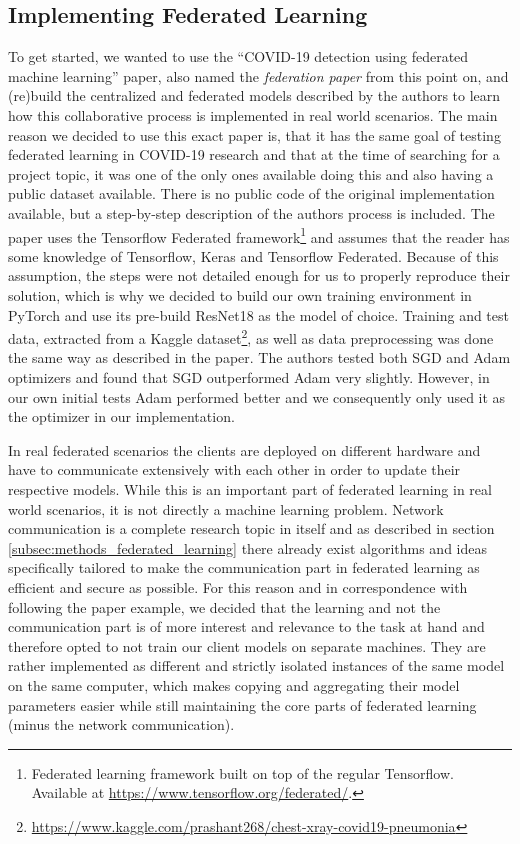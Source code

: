 \subsection{Implementing Federated Learning}\label{subsec:methods_original_paper}
To get started, we wanted to use the \enquote{COVID-19 detection using federated machine learning} paper\cite{federated_machine_learning}, also named the \textit{federation paper} from this point on, and (re)build the centralized and federated models described by the authors to learn how this collaborative process is implemented in real world scenarios. The main reason we decided to use this exact paper is, that it has the same goal of testing federated learning in COVID-19 research and that at the time of searching for a project topic, it was one of the only ones available doing this and also having a public dataset available.
There is no public code of the original implementation available, but a step-by-step description of the authors process is included. The paper uses the Tensorflow Federated framework\footnote{Federated learning framework built on top of the regular Tensorflow. Available at \url{https://www.tensorflow.org/federated/}.} and assumes that the reader has some knowledge of Tensorflow, Keras and Tensorflow Federated. Because of this assumption, the steps were not detailed enough for us to properly reproduce their solution, which is why we decided to build our own training environment in PyTorch and use its pre-build ResNet18 as the model of choice. Training and test data, extracted from a Kaggle dataset\footnote{\url{https://www.kaggle.com/prashant268/chest-xray-covid19-pneumonia}}, as well as data preprocessing was done the same way as described in the paper. The authors tested both SGD and Adam optimizers and found that SGD outperformed Adam very slightly. However, in our own initial tests Adam performed better and we consequently only used it as the optimizer in our implementation.

In real federated scenarios the clients are deployed on different hardware and have to communicate extensively with each other in order to update their respective models. While this is an important part of federated learning in real world scenarios, it is not directly a machine learning problem. Network communication is a complete research topic in itself and as described in section \ref{subsec:methods_federated_learning} there already exist algorithms and ideas specifically tailored to make the communication part in federated learning as efficient and secure as possible. For this reason and in correspondence with following the paper example, we decided that the learning and not the communication part is of more interest and relevance to the task at hand and therefore opted to not train our client models on separate machines. They are rather implemented as different and strictly isolated instances of the same model on the same computer, which makes copying and aggregating their model parameters easier while still maintaining the core parts of federated learning (minus the network communication).


